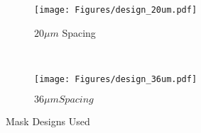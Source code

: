 \begin{figure}[!htb]
  \centering
  \begin{subfigure}[t]{0.5\textwidth}
      \centering
      \texttt{[image: Figures/design\_20um.pdf]}
      \caption{$20\mu m$ Spacing}
      \label{fig:20u_design}
  \end{subfigure}%
  ~
  \begin{subfigure}[t]{0.5\textwidth}
      \centering
      \texttt{[image: Figures/design\_36um.pdf]}
      \caption{$36\mu m Spacing$}
      \label{fig:36u_design}
  \end{subfigure}
  \caption{Mask Designs Used}
  \label{fig:mask_designs_1}
\end{figure}
